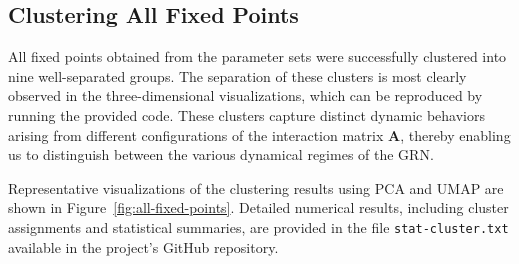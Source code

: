 \documentclass[a4paper,12pt]{article}
\begin{document}
\subsection{Clustering All Fixed Points}
All fixed points obtained from the parameter sets were successfully clustered into nine well-separated groups. The separation of these clusters is most clearly observed in the three-dimensional visualizations, which can be reproduced by running the provided code. These clusters capture distinct dynamic behaviors arising from different configurations of the interaction matrix \( \mathbf{A} \), thereby enabling us to distinguish between the various dynamical regimes of the GRN.

Representative visualizations of the clustering results using PCA and UMAP are shown in Figure~\ref{fig:all-fixed-points}. Detailed numerical results, including cluster assignments and statistical summaries, are provided in the file \texttt{stat-cluster.txt} available in the project’s GitHub repository.
\end{document}
